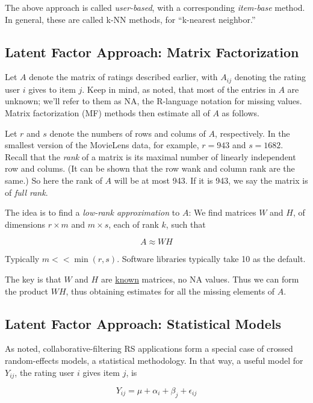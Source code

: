 The above approach is called \textit{user-based}, with a corresponding
\textit{item-base} method.  In general, these are called k-NN methods,
for ``k-nearest neighbor.''

\subsection{Latent Factor Approach:  Matrix Factorization}

Let $A$ denote the matrix of ratings described earlier, with $A_{ij}$
denoting the rating user $i$ gives to item $j$.  Keep in mind, as noted,
that most of the entries in $A$ are unknown; we'll refer to them as NA,
the R-language notation for missing values.  Matrix factorization (MF)
methods then estimate all of $A$ as follows.

Let $r$ and $s$ denote the numbers of rows and colums of $A$,
respectively.  In the smallest version of the MovieLens data, for
example, $r = 943$ and $s = 1682$.  Recall that the \textit{rank} of a
matrix is its maximal number of linearly independent row and colums.
(It can be shown that the row wank and column rank are the same.)  So
here the rank of $A$ will be at most 943.  If it is 943, we say the
matrix is of \textit{full rank}.

The idea is to find a \textit{low-rank approximation} to $A$:  We find
matrices $W$ and $H$, of dimensions $r \times m$ and $m \times s$, each
of rank $k$, such that 

\begin{equation}
A \approx WH
\end{equation}

Typically $m << \min(r,s)$.  Software libraries typically take 10 as the
default.

The key is that $W$ and $H$ are \underline{known} matrices, no NA
values.  Thus we can form the product $WH$, thus obtaining estimates for
all the missing elements of $A$.

\subsection{Latent Factor Approach: Statistical Models}

As noted, collaborative-filtering RS applications form a special case of
crossed random-effects models, a statistical methodology.  In that way,
a useful model for $Y_{ij}$, the rating user $i$ gives item $j$, is

\begin{equation}
Y_{ij} = \mu + \alpha_i + \beta_j + \epsilon_{ij}
\end{equation}

